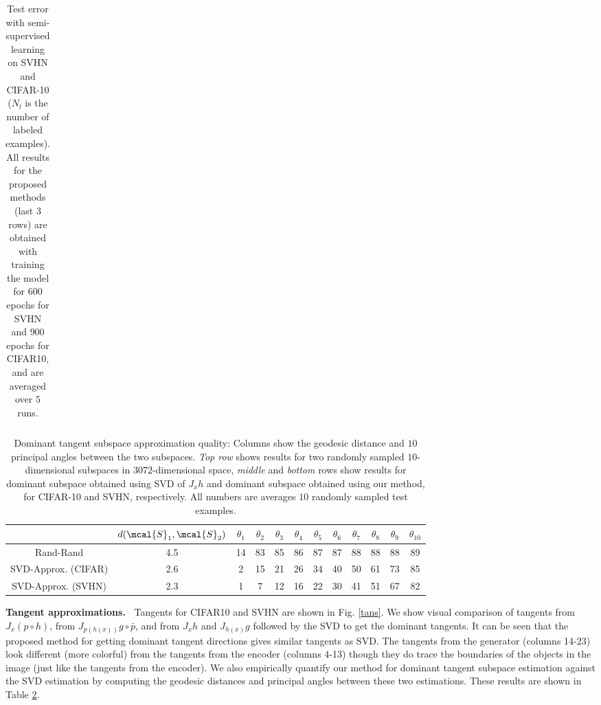\documentclass{article}
\begin{document}
\begin{table}[t]
\begin{tabular}{c c c c  c  }
\bottomrule
\end{tabular}
\vspace{2mm}
\caption{Test error with semi-supervised learning on SVHN and CIFAR-10 ($N_l$ is the number of labeled examples). All results for the proposed methods (last 3 rows) are obtained with training the model for $600$ epochs for SVHN and $900$ epochs for CIFAR10, and are averaged over $5$ runs. %
}
\label{tab:semisup}
\vspace{-2mm}
\end{table}\begin{table}[t]
	\centering
	\begin{tabular}{c c c c  c c c c c c c c }
		\toprule
		& $d(\mcal{S}_1,\mcal{S}_2)$ & $\theta_1$ & $\theta_2$ & $\theta_3$ & $\theta_4$ & $\theta_5$ & $\theta_6$ & $\theta_7$ & $\theta_8$ & $\theta_9$ & $\theta_{10}$ \\
		\midrule
	Rand-Rand & 4.5 & 14 &  83 &  85 &  86 &  87 &  87 &  88 &  88 &  88 &  89 \\
	SVD-Approx. (CIFAR)& 2.6 & 2& 15 & 21& 26& 34& 40& 50& 61& 73& 85 \\
	SVD-Approx. (SVHN)& 2.3 & 1& 7&  12& 16& 22& 30& 41& 51& 67& 82 \\
	
		\bottomrule
	\end{tabular}
	\vspace{2mm}
	\caption{Dominant tangent subspace approximation quality: Columns show the geodesic distance and $10$ principal angles between the two subspaces. \emph{Top row} shows results for two randomly sampled $10$-dimensional subspaces in $3072$-dimensional space,  \emph{middle} and \emph{bottom} rows show results for dominant subspace obtained using SVD of $J_{x}h$ and dominant subspace obtained using our method,  for CIFAR-10 and SVHN, respectively. All numbers are averages $10$ randomly sampled test examples.  
	}
	\label{tab:tanapprox}
	\vspace{-4mm}
\end{table}{\bf Tangent approximations.~} Tangents for CIFAR10 and SVHN are shown in Fig. \ref{tans}. We show visual comparison of tangents from $J_x (p\circ h)$, from $J_{p(h(x))} g\circ \bar{p}$, and from $J_x h$ and $J_{h(x)} g$  followed by the SVD to get the dominant tangents. It can be seen that the proposed method for getting dominant tangent directions gives similar tangents as SVD. The tangents from the generator (columns 14-23) look  different (more colorful) from the tangents from the encoder (columns 4-13) though they do trace the boundaries of the objects in the image (just like the tangents from the encoder). %
We also empirically quantify our method for dominant tangent subspace estimation against the SVD estimation by computing the geodesic distances and principal angles between these two estimations. These results are shown in Table \ref{tab:tanapprox}.  
\end{document}

